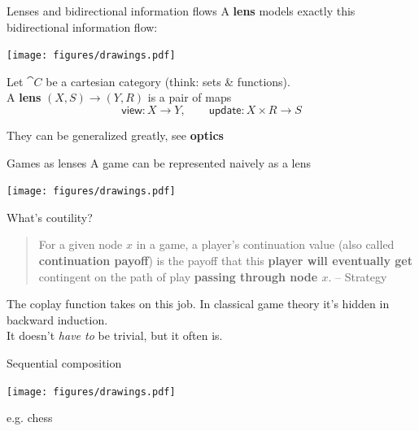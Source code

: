 \begin{frame}{Lenses and bidirectional information flows}
	A \textbf{lens} models exactly this bidirectional information flow:

	\begin{center}
		\texttt{[image: figures/drawings.pdf]}
	\end{center}

	\vspace{-2ex}
	\begin{definition}
		Let $\cat C$ be a cartesian category {\color{colornote}(think: sets \& functions)}.\\
		A \textbf{lens} $(X,S) \to (Y,R)$ is a pair of maps
		\begin{equation*}
			\mathsf{view} : X \to Y, \qquad
			\mathsf{update} : X \times R \to S
		\end{equation*}
	\end{definition}

	\vspace{-2ex}
	{\color{colornote}They can be generalized greatly, see \textbf{optics} \cite{riley2018optics}}
\end{frame}

\begin{frame}{Games as lenses}
	A game can be represented naively as a lens

	\begin{center}
		\texttt{[image: figures/drawings.pdf]}
	\end{center}
\end{frame}

\begin{frame}{What's coutility?}

	\vfill
	\begin{quotation}
		For a given node $x$ in a game, a player’s continuation value (also called \textbf{continuation payoff}) is the payoff that this \textbf{player will eventually get} contingent on the path of play \textbf{passing through node $x$}.
		{\color{colornote}-- Strategy \cite{watson2002strategy}}
	\end{quotation}

	\vfill
	The coplay function takes on this job. In classical game theory it's hidden in backward induction.\\[1.5ex]
	It doesn't \emph{have to} be trivial, but it often is.
\end{frame}

\begin{frame}{Sequential composition}
	\begin{center}
		\texttt{[image: figures/drawings.pdf]}
	\end{center}
	e.g. chess
\end{frame}

